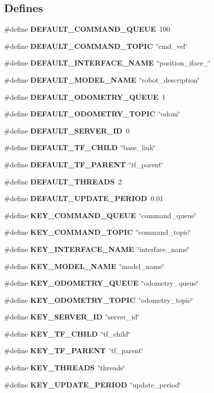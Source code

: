\subsection*{Defines}
\begin{DoxyCompactItemize}
\item 
\#define {\bf DEFAULT\_\-COMMAND\_\-QUEUE}~100
\item 
\#define {\bf DEFAULT\_\-COMMAND\_\-TOPIC}~\char`\"{}cmd\_\-vel\char`\"{}
\item 
\#define {\bf DEFAULT\_\-INTERFACE\_\-NAME}~\char`\"{}position\_\-iface\_\char`\"{}
\item 
\#define {\bf DEFAULT\_\-MODEL\_\-NAME}~\char`\"{}robot\_\-description\char`\"{}
\item 
\#define {\bf DEFAULT\_\-ODOMETRY\_\-QUEUE}~1
\item 
\#define {\bf DEFAULT\_\-ODOMETRY\_\-TOPIC}~\char`\"{}odom\char`\"{}
\item 
\#define {\bf DEFAULT\_\-SERVER\_\-ID}~0
\item 
\#define {\bf DEFAULT\_\-TF\_\-CHILD}~\char`\"{}base\_\-link\char`\"{}
\item 
\#define {\bf DEFAULT\_\-TF\_\-PARENT}~\char`\"{}tf\_\-parent\char`\"{}
\item 
\#define {\bf DEFAULT\_\-THREADS}~2
\item 
\#define {\bf DEFAULT\_\-UPDATE\_\-PERIOD}~0.01
\item 
\#define {\bf KEY\_\-COMMAND\_\-QUEUE}~\char`\"{}command\_\-queue\char`\"{}
\item 
\#define {\bf KEY\_\-COMMAND\_\-TOPIC}~\char`\"{}command\_\-topic\char`\"{}
\item 
\#define {\bf KEY\_\-INTERFACE\_\-NAME}~\char`\"{}interface\_\-name\char`\"{}
\item 
\#define {\bf KEY\_\-MODEL\_\-NAME}~\char`\"{}model\_\-name\char`\"{}
\item 
\#define {\bf KEY\_\-ODOMETRY\_\-QUEUE}~\char`\"{}odometry\_\-queue\char`\"{}
\item 
\#define {\bf KEY\_\-ODOMETRY\_\-TOPIC}~\char`\"{}odometry\_\-topic\char`\"{}
\item 
\#define {\bf KEY\_\-SERVER\_\-ID}~\char`\"{}server\_\-id\char`\"{}
\item 
\#define {\bf KEY\_\-TF\_\-CHILD}~\char`\"{}tf\_\-child\char`\"{}
\item 
\#define {\bf KEY\_\-TF\_\-PARENT}~\char`\"{}tf\_\-parent\char`\"{}
\item 
\#define {\bf KEY\_\-THREADS}~\char`\"{}threads\char`\"{}
\item 
\#define {\bf KEY\_\-UPDATE\_\-PERIOD}~\char`\"{}update\_\-period\char`\"{}
\end{DoxyCompactItemize}
